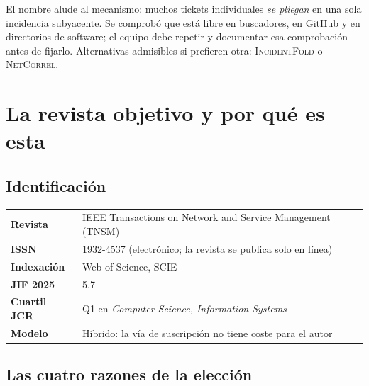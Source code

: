 \documentclass[11pt,a4paper]{article}
\begin{document}
El nombre alude al mecanismo: muchos tickets individuales \emph{se pliegan} en una sola incidencia subyacente. Se comprobó que está libre en buscadores, en GitHub y en directorios de software; el equipo debe repetir y documentar esa comprobación antes de fijarlo. Alternativas admisibles si prefieren otra: \textsc{IncidentFold} o \textsc{NetCorrel}.

\section{La revista objetivo y por qué es esta}

\subsection{Identificación}

\begin{center}
	\small
	\begin{tabular}{@{}p{4.4cm}p{10.6cm}@{}}
		\toprule
		\textbf{Revista} & IEEE Transactions on Network and Service Management (TNSM) \\
		\textbf{ISSN} & 1932-4537 (electrónico; la revista se publica solo en línea) \\
		\textbf{Indexación} & Web of Science, SCIE \\
		\textbf{JIF 2025} & 5,7 \\
		\textbf{Cuartil JCR} & Q1 en \emph{Computer Science, Information Systems} \\
		\textbf{Modelo} & Híbrido: la vía de suscripción no tiene coste para el autor \\
		\bottomrule
	\end{tabular}
\end{center}

\subsection{Las cuatro razones de la elección}
\end{document}
